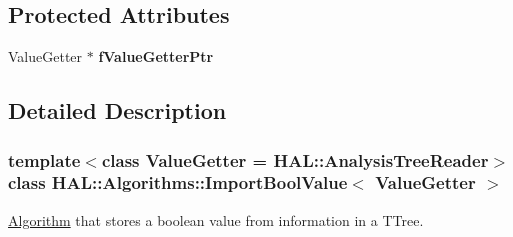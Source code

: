 \subsection*{Protected Attributes}
\begin{DoxyCompactItemize}
\item 
\hypertarget{class_h_a_l_1_1_algorithms_1_1_import_bool_value_a8113934acb2bd48e34891d956f52c497}{Value\+Getter $\ast$ {\bfseries f\+Value\+Getter\+Ptr}}\label{class_h_a_l_1_1_algorithms_1_1_import_bool_value_a8113934acb2bd48e34891d956f52c497}

\end{DoxyCompactItemize}


\subsection{Detailed Description}
\subsubsection*{template$<$class Value\+Getter = H\+A\+L\+::\+Analysis\+Tree\+Reader$>$class H\+A\+L\+::\+Algorithms\+::\+Import\+Bool\+Value$<$ Value\+Getter $>$}

\hyperlink{class_h_a_l_1_1_algorithm}{Algorithm} that stores a boolean value from information in a T\+Tree. 

